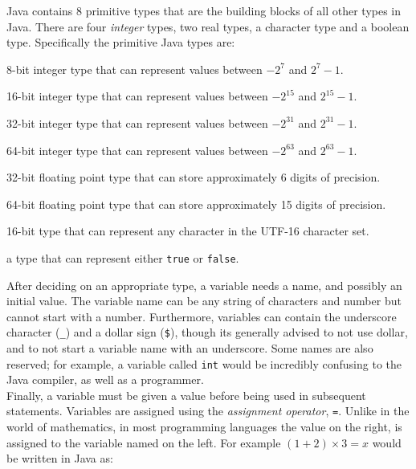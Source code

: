 \noindent
Java contains 8 primitive types that are the building blocks of all other types in Java. There are four \emph{integer} types, two {real} types, a character type and a boolean type. Specifically the primitive Java types are:

\begin{description}[style=multiline,leftmargin=2cm,font=\normalfont]
	\item[\tt byte] 8-bit integer type that can represent values between $-2^7$ and $2^7-1$. 
	\item[\tt short] 16-bit integer type that can represent values between $-2^{15}$ and $2^{15}-1$.
	\item[\tt int] 32-bit integer type that can represent values between $-2^{31}$ and $2^{31}-1$.
	\item[\tt long] 64-bit integer type that can represent values between $-2^{63}$ and $2^{63}-1$.
	\item[\tt float] 32-bit floating point type that can store approximately 6 digits of precision.
	\item[\tt double] 64-bit floating point type that can store approximately 15 digits of precision.
	\item[\tt char] 16-bit type that can represent any character in the UTF-16 character set.
	\item[\tt boolean] a type that can represent either {\tt true} or {\tt false}.
\end{description}

After deciding on an appropriate type, a variable needs a name, and possibly an initial value. The variable name can be any string of characters and number but cannot start with a number. Furthermore, variables can contain the underscore character ({\tt \_}) and a dollar sign ({\tt \$}), though its generally advised to not use dollar, and to not start a variable name with an underscore. Some names are also reserved; for example, a variable called {\tt int} would be incredibly confusing to the Java compiler, as well as a programmer.\\

Finally, a variable must be given a value before being used in subsequent statements. Variables are assigned using the \emph{assignment operator}, {\tt =}. Unlike in the world of mathematics, in most programming languages the value on the right, is assigned to the variable named on the left. For example $(1 + 2) \times 3 = x$ would be written in Java as: \\

